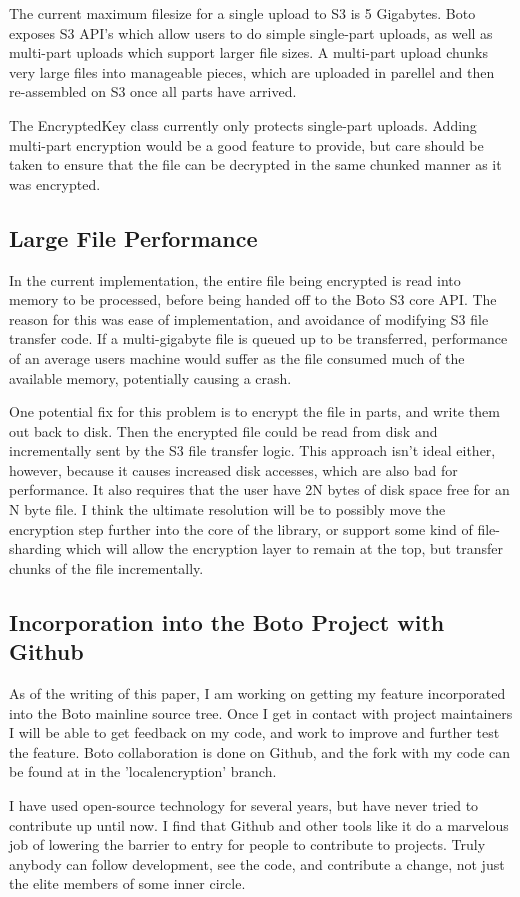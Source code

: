 The current maximum filesize for a single upload to S3 is 5 Gigabytes. Boto exposes S3 API's which allow users to do simple
single-part uploads, as well as multi-part uploads which support larger file sizes. A multi-part upload chunks very large 
files into manageable pieces, which are uploaded in parellel and then re-assembled on S3 once all parts have arrived.

The EncryptedKey class currently only protects single-part uploads. Adding multi-part encryption would be a good feature
to provide, but care should be taken to ensure that the file can be decrypted in the same chunked manner as it was
encrypted.

\subsection{Large File Performance}

In the current implementation, the entire file being encrypted is read into memory to be processed, before being handed off
to the Boto S3 core API. The reason for this was ease of implementation, and avoidance of modifying S3 file transfer code.
If a multi-gigabyte file is queued up to be transferred, performance of an average users machine would suffer as the file 
consumed much of the available memory, potentially causing a crash.

One potential fix for this problem is to encrypt the file in parts, and write them out back to disk. Then the encrypted file could be read from disk and incrementally sent by the S3 file transfer logic. This approach isn't ideal either, however, because it causes
increased disk accesses, which are also bad for performance. It also requires that the user have 2N bytes of disk 
space free for an N byte file. I think the ultimate resolution will be to possibly move the encryption step further into the core
of the library, or support some kind of file-sharding which will allow the encryption layer to remain at the top, but transfer chunks of the file incrementally.

\subsection{Incorporation into the Boto Project with Github}
As of the writing of this paper, I am working on getting my feature incorporated into the Boto mainline source tree. Once I 
get in contact with project maintainers I will be able to get feedback on my code, and work to improve and further test the
feature. Boto collaboration is done on Github, and the fork with my code can be found at \cite{CodyBoto} in the 'localencryption' branch.

I have used open-source technology for several years, but have never tried to contribute up until now. I find that Github and other tools like it do a marvelous job of
lowering the barrier to entry for people to contribute to projects. Truly anybody can follow development, see the code, and contribute a change, not just the elite members of some inner circle.


